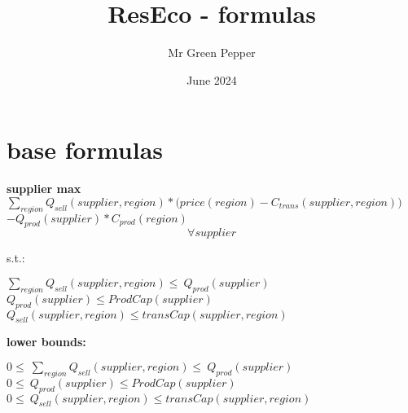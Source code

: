 \documentclass{article}
\title{ResEco - formulas}
\author{Mr Green Pepper}
\date{June 2024}
\begin{document}
\maketitle

\section{base formulas}
\textbf{supplier max}
\(\sum_{region} Q_{sell}(supplier, region) *\Big(price(region) - C_{trans}(supplier,region)\Big) \)\\
\tab\tab\(- Q_{prod}(supplier)*C_{prod}(region)\) $$\forall supplier$$

s.t.:
\begin{center}
\(\sum_{region} Q_{sell}(supplier, region) \leq\ Q_{prod}(supplier) \)
\(Q_{prod}(supplier) \leq ProdCap(supplier)\)
\(Q_{sell}(supplier, region) \leq transCap(supplier, region)\)
\end{center}

\textbf{lower bounds:}

\begin{center}
\(0 \leq\ \sum_{region} Q_{sell}(supplier, region) \leq\ Q_{prod}(supplier) \)
\(0 \leq\ Q_{prod}(supplier) \leq ProdCap(supplier)\)
\(0 \leq\ Q_{sell}(supplier, region) \leq transCap(supplier, region)\)
\end{center}
\end{document}
